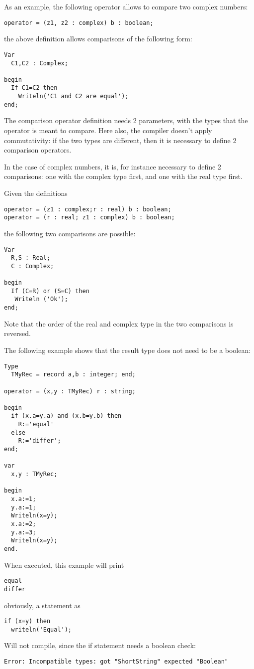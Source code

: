 As an example, the following operator allows to compare two complex
numbers:
\begin{verbatim}
operator = (z1, z2 : complex) b : boolean;
\end{verbatim}
the above definition allows comparisons of the following form:
\begin{verbatim}
Var
  C1,C2 : Complex;

begin
  If C1=C2 then
    Writeln('C1 and C2 are equal');
end;
\end{verbatim}

The comparison operator definition needs 2 parameters, with the types that
the operator is meant to compare. Here also, the compiler doesn't apply
commutativity: if the two types are different, then it is necessary to
define 2 comparison operators.

In the case of complex numbers, it is, for instance necessary to define
2 comparisons: one with the complex type first, and one with the real type
first.

Given the definitions
\begin{verbatim}
operator = (z1 : complex;r : real) b : boolean;
operator = (r : real; z1 : complex) b : boolean;
\end{verbatim}
the following two comparisons are possible:
\begin{verbatim}
Var
  R,S : Real;
  C : Complex;

begin
  If (C=R) or (S=C) then
   Writeln ('Ok');
end;
\end{verbatim}
Note that the order of the real and complex type in the two comparisons
is reversed.

The following example shows that the result type does not need to be a boolean:
\begin{verbatim}
Type
  TMyRec = record a,b : integer; end;

operator = (x,y : TMyRec) r : string;

begin
  if (x.a=y.a) and (x.b=y.b) then
    R:='equal'
  else
    R:='differ';
end;

var
  x,y : TMyRec;

begin
  x.a:=1;
  y.a:=1;
  Writeln(x=y);
  x.a:=2;
  y.a:=3;
  Writeln(x=y);
end.
\end{verbatim}
When executed, this example will print
\begin{verbatim}
equal
differ
\end{verbatim}
obviously, a statement as
\begin{verbatim}
if (x=y) then
  writeln('Equal');
\end{verbatim}
Will not compile, since the if statement needs a boolean check:
\begin{verbatim}
Error: Incompatible types: got "ShortString" expected "Boolean"
\end{verbatim}

